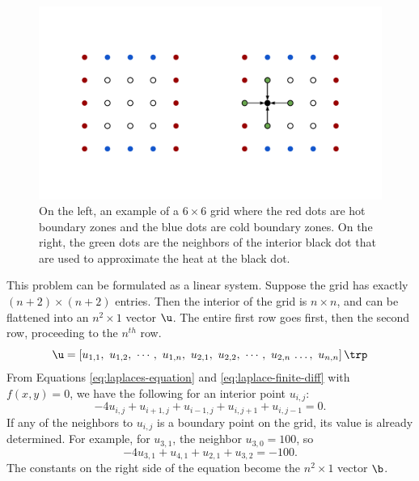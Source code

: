 \begin{figure}[H]
    \includegraphics[width=\linewidth]{Grid.pdf}
    \caption{On the left, an example of a $6\times 6$ grid where the red dots are hot boundary zones and the blue dots are cold boundary zones.
    On the right, the green dots are the neighbors of the interior black dot that are used to approximate the heat at the black dot.}
    \label{fig:itersolve-finite-difference-grid}
\end{figure}

This problem can be formulated as a linear system.
Suppose the grid has exactly $(n+2)\times (n+2)$ entries.
Then the interior of the grid is $n\times n$, and can be flattened into an $n^2\times 1$ vector $\u$.
The entire first row goes first, then the second row, proceeding to the $n^{th}$ row.
\[\u = \left[u_{1,1},\ u_{1,2},\ \cdots,\ u_{1,n},\ u_{2,1},\ u_{2,2},\ \cdots,\ u_{2,n}\, \ldots,\ u_{n,n}\right]\trp\]
From Equations \ref{eq:laplaces-equation} and \ref{eq:laplace-finite-diff} with $f(x,y) = 0$, we have the following for an interior point $u_{i,j}$:
\begin{equation}
-4u_{i,j} + u_{i+1,j} + u_{i-1,j} + u_{i,j+1} +  u_{i,j-1} = 0.
\label{eq:hot-plate}
\end{equation}
If any of the neighbors to $u_{i,j}$ is a boundary point on the grid, its value is already determined.
For example, for $u_{3,1}$, the neighbor $u_{3,0} = 100$, so
\[-4u_{3,1} + u_{4,1} + u_{2,1} + u_{3,2} = -100.\]
The constants on the right side of the equation become the $n^2\times 1$ vector $\b$.

